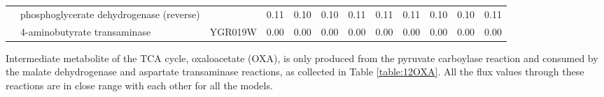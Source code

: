 \begin{table}[H]
{\begin{tabular}{clcccccccccc}
                        & phosphoglycerate dehydrogenase (reverse)                                                      &                                                           & 0.11      & 0.10      & 0.10     & 0.11                                                          & 0.11 & 0.11   & 0.10                                                      & 0.10   & 0.11     \\
                        & 4-aminobutyrate transaminase                                                                  & YGR019W                                                   & 0.00      & 0.00      & 0.00     & 0.00                                                          & 0.00 & 0.00   & 0.00                                                      & 0.00   & 0.00     \\ \hline
\end{tabular}}
\label{table:122KG}
\end{table}

Intermediate metabolite of the TCA cycle, oxaloacetate (OXA), is only produced from the pyruvate carboylase reaction and consumed by the malate dehydrogenase and aspartate transaminase reactions, as collected in Table \ref{table:12OXA}. All the flux values through these reactions are in close range with each other for all the models.


